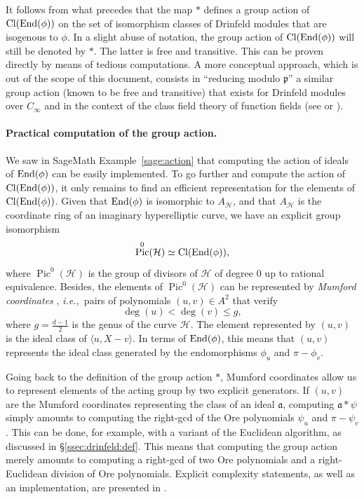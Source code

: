 \documentclass[11pt]{article}
\theoremstyle{definition}
\newcommand\End{\text{\rm End}}
\renewcommand{\H}{\mathcal H}
\DeclareMathOperator{\Pic}{Pic}
\DeclareMathOperator{\Cl}{Cl}
\newcommand{\Cinf}{C_{\infty}}
\renewcommand{\a}{\mathfrak{a}}
\newcommand{\ie}{\textit{i.e.,~}}
\begin{document}
It follows from what precedes that the map $\ast$ defines a group action 
of $\Cl(\End(\phi))$ on the set of isomorphism classes of Drinfeld modules
that are isogenous to $\phi$. In a slight abuse of notation, the group
action of $\Cl(\End(\phi))$ will still be denoted by $\ast$.
The latter is free and transitive. This can be proven directly by
means of tedious computations. A more conceptual approach, which is out of the
scope of this document, consists in ``reducing modulo $\mathfrak p$'' a similar
group action (known to be free and transitive) that exists for Drinfeld modules
over $\Cinf$ and in the context of the class field theory of function fields (see
\cite[Theorem~9.3]{hayes_brief_2011} or \cite[\S~2.3]{leudiere_computing_2024}). 

\paragraph{Practical computation of the group action.}

We saw in SageMath Example~\ref{sage:action} that computing the action
of ideals of $\End(\phi)$ can be easily implemented.
To go further and compute the action of $\Cl(\End(\phi))$, it 
only remains to find an efficient representation for the elements of
$\Cl(\End(\phi))$. Given that $\End(\phi)$ is isomorphic to $A_\H$, and
that $A_\H$ is the coordinate ring of an imaginary hyperelliptic curve, we have an explicit group isomorphism
\[
  \Pic^0(\H) \simeq \Cl(\End(\phi)),
\]
where $\Pic^0(\H)$ is the group of divisors of $\H$ of degree $0$ up to
rational equivalence. Besides, the elements of $\Pic^0(\H)$ can be represented
by \emph{Mumford coordinates} \cite[Theorem~14.5]{cohen_handbook_2012},
\ie pairs of polynomials $(u, v) \in A^2$ that verify
\[
  \deg(u) < \deg(v) \leqslant g,
\]
where $g=\frac{d-1}{2}$ is the genus of the curve $\mathcal{H}$.
The element represented by $(u, v)$ is the ideal class of $\langle u,
X-v\rangle$. In terms of $\End(\phi)$, this means that $(u, v)$ represents
the ideal class generated by the endomorphisms $\phi_u$ and $\pi - \phi_v$.

Going back to the definition of the group action $\ast$, Mumford coordinates
allow us to represent elements of the acting group by two explicit generators.
If $(u, v)$ are the Mumford coordinates representing the class of an ideal
$\a$, computing $\a \ast \psi$ simply
amounts to computing the right-gcd of the Ore polynomials $\psi_u$ and $\pi -
\psi_v$. This can be done, for example, with a variant of the Euclidean algorithm,
as discussed in \S\ref{ssec:drinfeld:def}. This means that computing the group
action merely amounts to computing a right-gcd of two Ore polynomials and a
right-Euclidean division of Ore polynomials. Explicit complexity statements, as
well as an implementation, are presented in \cite{leudiere_computing_2024}.
\end{document}
